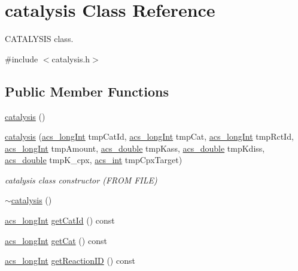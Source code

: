 \hypertarget{a00001}{\section{catalysis Class Reference}
\label{a00001}
}


C\-A\-T\-A\-L\-Y\-S\-I\-S class.  




{\ttfamily \#include $<$catalysis.\-h$>$}

\subsection*{Public Member Functions}
\begin{DoxyCompactItemize}
\item 
\hyperlink{a00001_a7c4d1a67d2745293a17a6bee0df7c5cd}{catalysis} ()
\item 
\hyperlink{a00001_ab6af429c051e2bc9756bac72b99cc4ce}{catalysis} (\hyperlink{a00016_a19319d75f02db4308bc5c0026d98cd85}{acs\-\_\-long\-Int} tmp\-Cat\-Id, \hyperlink{a00016_a19319d75f02db4308bc5c0026d98cd85}{acs\-\_\-long\-Int} tmp\-Cat, \hyperlink{a00016_a19319d75f02db4308bc5c0026d98cd85}{acs\-\_\-long\-Int} tmp\-Rct\-Id, \hyperlink{a00016_a19319d75f02db4308bc5c0026d98cd85}{acs\-\_\-long\-Int} tmp\-Amount, \hyperlink{a00016_ab776853a005fcbf56af0424a2a4dd607}{acs\-\_\-double} tmp\-Kass, \hyperlink{a00016_ab776853a005fcbf56af0424a2a4dd607}{acs\-\_\-double} tmp\-Kdiss, \hyperlink{a00016_ab776853a005fcbf56af0424a2a4dd607}{acs\-\_\-double} tmp\-K\-\_\-cpx, \hyperlink{a00016_a8d277355641a098190360234e2ebde35}{acs\-\_\-int} tmp\-Cpx\-Target)
\begin{DoxyCompactList}\small\item\em catalysis class constructor (F\-R\-O\-M F\-I\-L\-E) \end{DoxyCompactList}\item 
\hyperlink{a00001_a982805165c59e95ac055dc24e684fa05}{$\sim$catalysis} ()
\item 
\hyperlink{a00016_a19319d75f02db4308bc5c0026d98cd85}{acs\-\_\-long\-Int} \hyperlink{a00001_a85ba5bd9c758392f245f1277141a1706}{get\-Cat\-Id} () const 
\item 
\hyperlink{a00016_a19319d75f02db4308bc5c0026d98cd85}{acs\-\_\-long\-Int} \hyperlink{a00001_a205e222dff1e80ff8f3195ab22e78726}{get\-Cat} () const 
\item 
\hyperlink{a00016_a19319d75f02db4308bc5c0026d98cd85}{acs\-\_\-long\-Int} \hyperlink{a00001_a6e0eea2f12109b36bb522ac971d1db29}{get\-Reaction\-I\-D} () const 

\end{DoxyCompactItemize}
